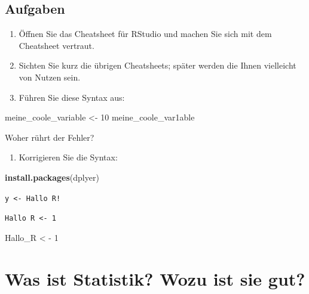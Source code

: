 \documentclass[12pt,ngerman,]{book}
\makeatletter
\newenvironment{Shaded}{\begin{snugshade}}{\end{snugshade}}
\newcommand{\KeywordTok}[1]{\textcolor[rgb]{0.13,0.29,0.53}{\textbf{{#1}}}}
\newcommand{\DecValTok}[1]{\textcolor[rgb]{0.00,0.00,0.81}{{#1}}}
\newcommand{\StringTok}[1]{\textcolor[rgb]{0.31,0.60,0.02}{{#1}}}
\newcommand{\NormalTok}[1]{{#1}}
\providecommand{\tightlist}{%
  \setlength{\itemsep}{0pt}\setlength{\parskip}{0pt}}
\newenvironment{kframe}{%
\medskip{}
\setlength{\fboxsep}{.8em}
 \def\at@end@of@kframe{}%
 \ifinner\ifhmode%
  \def\at@end@of@kframe{\end{minipage}}%
  \begin{minipage}{\columnwidth}%
 \fi\fi%
 \def\FrameCommand##1{\hskip\@totalleftmargin \hskip-\fboxsep
 \colorbox{shadecolor}{##1}\hskip-\fboxsep
     \hskip-\linewidth \hskip-\@totalleftmargin \hskip\columnwidth}%
 \MakeFramed {\advance\hsize-\width
   \@totalleftmargin\z@ \linewidth\hsize
   \@setminipage}}%
 {\par\unskip\endMakeFramed%
 \at@end@of@kframe}
\renewenvironment{Shaded}{\begin{kframe}}{\end{kframe}}
\theoremstyle{definition}
\theoremstyle{definition}
\theoremstyle{remark}
\makeatother
\begin{document}
\subsection{Aufgaben}\label{aufgaben}

\begin{enumerate}
\def\labelenumi{\arabic{enumi}.}
\item
  Öffnen Sie das Cheatsheet für RStudio und machen Sie sich mit dem
  Cheatsheet vertraut.
\item
  Sichten Sie kurz die übrigen Cheatsheets; später werden die Ihnen
  vielleicht von Nutzen sein.
\item
  Führen Sie diese Syntax aus:
\end{enumerate}

\begin{Shaded}
\begin{Highlighting}[]
\NormalTok{meine_coole_variable <-}\StringTok{ }\DecValTok{10}
\NormalTok{meine_coole_var1able }
\end{Highlighting}
\end{Shaded}

Woher rührt der Fehler?

\begin{enumerate}
\def\labelenumi{\arabic{enumi}.}
\setcounter{enumi}{3}
\tightlist
\item
  Korrigieren Sie die Syntax:
\end{enumerate}

\begin{Shaded}
\begin{Highlighting}[]
\KeywordTok{install.packages}\NormalTok{(dplyer)}
\end{Highlighting}
\end{Shaded}

\texttt{y\ \textless{}-\ Hallo\ R!}

\texttt{Hallo\ R\ \textless{}-\ 1}

\begin{Shaded}
\begin{Highlighting}[]
\NormalTok{Hallo_R <}\StringTok{ }\NormalTok{-}\StringTok{ }\DecValTok{1}
\end{Highlighting}
\end{Shaded}

\section{Was ist Statistik? Wozu ist sie
gut?}\label{was-ist-statistik-wozu-ist-sie-gut}
\end{document}
